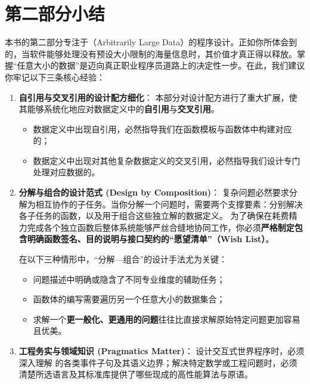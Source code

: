 
\chapter{第二部分小结}
\label{sec:ch13_summary}

本书的第二部分专注于（Arbitrarily Large Data）的程序设计。正如你所体会到的，当软件能够处理没有预设大小限制的海量信息时，其价值才真正得以释放。掌握“任意大小的数据”是迈向真正职业程序员道路上的决定性一步。在此，我们建议你牢记以下三条核心经验：

\begin{notebox}[第二部分核心收获]
\begin{enumerate}
  \item \textbf{自引用与交叉引用的设计配方细化}：
  本部分对设计配方进行了重大扩展，使其能够系统化地应对数据定义中的\textbf{自引用}与\textbf{交叉引用}。
  \begin{itemize}
    \item 数据定义中出现自引用，必然指导我们在函数模板与函数体中构建对应的；
    \item 数据定义中出现对其他复杂数据定义的交叉引用，必然指导我们设计专门处理对应数据的。
  \end{itemize}

  \item \textbf{分解与组合的设计范式 (Design by Composition)}：
  复杂问题必然要求分解为相互协作的子任务。当你分解一个问题时，需要两个支撑要素：分别解决各子任务的函数，以及用于组合这些独立解的数据定义。
  为了确保在耗费精力完成各个独立函数后整体系统能够严丝合缝地协同工作，你必须\textbf{严格制定包含明确函数签名、目的说明与接口契约的“愿望清单”（Wish List）}。
  
  在以下三种情形中，“分解—组合”的设计手法尤为关键：
  \begin{itemize}
    \item 问题描述中明确或隐含了不同专业维度的辅助任务；
    \item 函数体的编写需要遍历另一个任意大小的数据集合；
    \item 求解一个\textbf{更一般化、更通用的问题}往往比直接求解原始特定问题更加容易且优美。
  \end{itemize}

  \item \textbf{工程务实与领域知识 (Pragmatics Matter)}：
  设计交互式世界程序时，必须深入理解  的各类事件子句及其语义边界；解决特定数学或工程问题时，必须清楚所选语言及其标准库提供了哪些现成的高性能算法与原语。
\end{enumerate}
\end{notebox}

